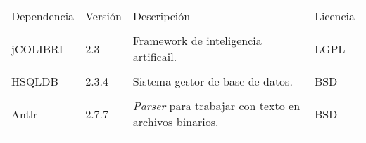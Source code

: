 \begin{longtable}[]{@{}llll@{}}
\toprule
\begin{minipage}[b]{0.18\columnwidth}\raggedright\strut
Dependencia\strut
\end{minipage} & \begin{minipage}[b]{0.10\columnwidth}\raggedright\strut
Versión\strut
\end{minipage} & \begin{minipage}[b]{0.49\columnwidth}\raggedright\strut
Descripción\strut
\end{minipage} & \begin{minipage}[b]{0.11\columnwidth}\raggedright\strut
Licencia\strut
\end{minipage}\tabularnewline\tabularnewline
\midrule
\endhead


\begin{minipage}[t]{0.18\columnwidth}\raggedright\strut
jCOLIBRI \cite{lic:jcol} \strut
\end{minipage} & \begin{minipage}[t]{0.08\columnwidth}\raggedright\strut
2.3\strut
\end{minipage} & \begin{minipage}[t]{0.49\columnwidth}\raggedright\strut
Framework de inteligencia artificail.\strut
\end{minipage} & \begin{minipage}[t]{0.11\columnwidth}\raggedright\strut
LGPL\strut
\end{minipage}\tabularnewline\tabularnewline


\begin{minipage}[t]{0.18\columnwidth}\raggedright\strut
HSQLDB \cite{lic:hsql} \strut
\end{minipage} & \begin{minipage}[t]{0.08\columnwidth}\raggedright\strut
2.3.4\strut
\end{minipage} & \begin{minipage}[t]{0.49\columnwidth}\raggedright\strut
Sistema gestor de base de datos.\strut
\end{minipage} & \begin{minipage}[t]{0.11\columnwidth}\raggedright\strut
BSD\strut
\end{minipage}\tabularnewline\tabularnewline


\begin{minipage}[t]{0.18\columnwidth}\raggedright\strut
Antlr \cite{lic:antlr} \strut
\end{minipage} & \begin{minipage}[t]{0.08\columnwidth}\raggedright\strut
2.7.7\strut
\end{minipage} & \begin{minipage}[t]{0.49\columnwidth}\raggedright\strut
\emph{Parser} para trabajar con texto en archivos binarios. \strut
\end{minipage} & \begin{minipage}[t]{0.11\columnwidth}\raggedright\strut
BSD\strut
\end{minipage}\tabularnewline\tabularnewline



\end{longtable}

